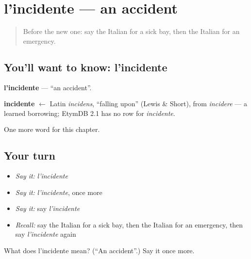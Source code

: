 \section[l'incidente]{l'incidente — an accident}

\label{lesson:IT-C243-incidente}



\begin{quote}
Before the new one: say the Italian for a sick bay, then the Italian for an emergency.
\end{quote}

\subsection*{You'll want to know: l'incidente}
\textbf{l'incidente} — \textquotedblleft{}an accident\textquotedblright{}.

\begin{cousinweb}
\textbf{incidente} $\leftarrow$ Latin \emph{incidens}, \textquotedblleft{}falling upon\textquotedblright{} (Lewis \& Short), from \emph{incidere} — a learned borrowing; EtymDB 2.1 has no row for \emph{incidente}.
\end{cousinweb}

\begin{grammarlens}[title={What you've built}]
One more word for this chapter.
\end{grammarlens}

\subsection*{Your turn}
\begin{itemize}
\raggedright
  \item \emph{Say it:} \emph{l'incidente}
  \item \emph{Say it:} \emph{l'incidente}, once more
  \item \emph{Say it:} say \emph{l'incidente}
  \item \emph{Recall:} say the Italian for a sick bay, then the Italian for an emergency, then say \emph{l'incidente} again
\end{itemize}

\begin{tcolorbox}[breakable,colback=teal!4,colframe=teal!35!black,title={Before you move on}]
What does l'incidente mean? (\textquotedblleft{}An accident\textquotedblright{}.) Say it once more.
\end{tcolorbox}
